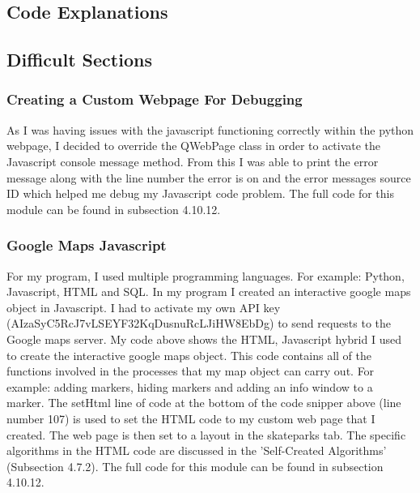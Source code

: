 \begin{landscape}
\section{Code Explanations}

\subsection{Difficult Sections}

\subsubsection{Creating a Custom Webpage For Debugging}


As I was having issues with the javascript functioning correctly within the python webpage, I decided to override the QWebPage class in order to activate the Javascript console message method. From this I was able to print the error message along with the line number the error is on and the error messages source ID which helped me debug my Javascript code problem. The full code for this module can be found in subsection 4.10.12.

\subsubsection{Google Maps Javascript}

For my program, I used multiple programming languages. For example: Python, Javascript, HTML and SQL. In my program I created an interactive google maps object in Javascript. I had to activate my own API key (AIzaSyC5RcJ7vLSEYF32KqDusnuRcLJiHW8EbDg) to send requests to the Google maps server. My code above shows the HTML, Javascript hybrid I used to create the interactive google maps object. This code contains all of the functions involved in the processes that my map object can carry out. For example: adding markers, hiding markers and adding an info window to a marker. The setHtml line of code at the bottom of the code snipper above (line number 107) is used to set the HTML code to my custom web page that I created. The web page is then set to a layout in the skateparks tab. The specific algorithms in the HTML code are discussed in the 'Self-Created Algorithms' (Subsection 4.7.2). The full code for this module can be found in subsection 4.10.12.




\end{landscape}
